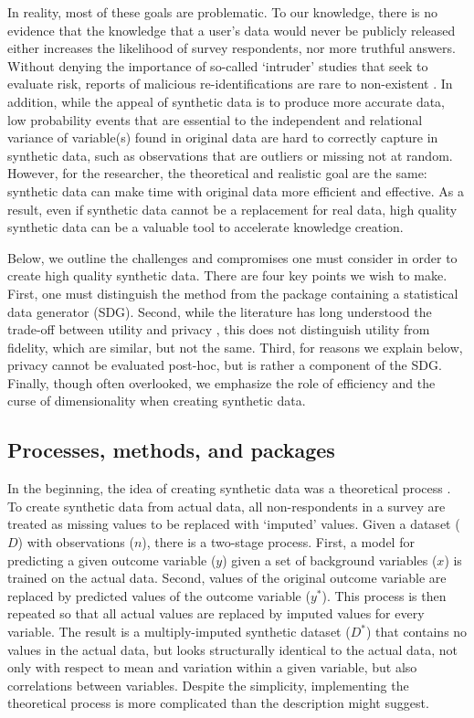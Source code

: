 \documentclass[runningheads]{llncs}
\begin{document}
In reality, most of these goals are problematic.  To our knowledge, there is no evidence that the knowledge that a user's data would never be publicly released either increases the likelihood of survey respondents, nor more truthful answers.  Without denying the importance of so-called `intruder' studies that seek to evaluate risk, reports of malicious re-identifications are rare to non-existent \cite{francis_wagner_yyyy}.  In addition, while the appeal of synthetic data is to produce more accurate data, low probability events that are essential to the independent and relational variance of variable(s) found in original data are hard to correctly capture in synthetic data, such as observations that are outliers or missing not at random.  However, for the researcher, the theoretical and realistic goal are the same: synthetic data can make time with original data more efficient and effective.  As a result, even if synthetic data cannot be a replacement for real data, high quality synthetic data can be a valuable tool to accelerate knowledge creation.  

Below, we outline the challenges and compromises one must consider in order to create high quality synthetic data.  There are four key points we wish to make.  First, one must distinguish the method from the package containing a statistical data generator (SDG).  Second, while the literature has long understood the trade-off between utility and privacy \cite{duncan2004database}, this does not distinguish utility from fidelity, which are similar, but not the same.  Third, for reasons we explain below, privacy cannot be evaluated post-hoc, but is rather a component of the SDG.  Finally, though often overlooked, we emphasize the role of efficiency and the curse of dimensionality when creating synthetic data.  

\subsection{Processes, methods, and packages}

In the beginning, the idea of creating synthetic data was a theoretical process \cite{rubin1993statistical}.  To create synthetic data from actual data, all non-respondents in a survey are treated as missing values to be replaced with `imputed' values.  Given a dataset ($D$) with observations ($n$), there is a two-stage process.  First, a model for predicting a given outcome variable ($y$) given a set of background variables ($x$) is trained on the actual data.  Second, values of the original outcome variable are replaced by predicted values of the outcome variable ($y^*$).  This process is then repeated so that all actual values are replaced by imputed values for every variable.  The result is a multiply-imputed synthetic dataset ($D^*$) that contains no values in the actual data, but looks structurally identical to the actual data, not only with respect to mean and variation within a given variable, but also correlations between variables.  Despite the simplicity, implementing the theoretical process is more complicated than the description might suggest.  
\end{document}

